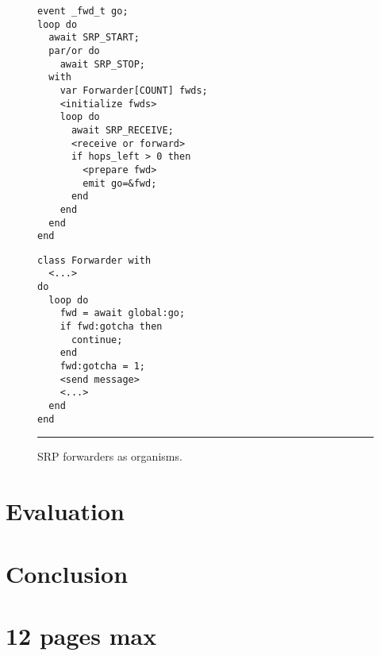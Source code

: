 \documentclass{sig-alternate-ipsn13}
\begin{document}
\begin{figure}[t]
\begin{minipage}[t]{0.45\linewidth}
{\small
\begin{verbatim}
event _fwd_t go;
loop do
  await SRP_START;
  par/or do
    await SRP_STOP;
  with
    var Forwarder[COUNT] fwds;
    <initialize fwds>
    loop do
      await SRP_RECEIVE;
      <receive or forward>
      if hops_left > 0 then
        <prepare fwd>
        emit go=&fwd;
      end
    end
  end
end
\end{verbatim}
}
\end{minipage}
%
\hspace{0.0cm}
%
\begin{minipage}[t]{0.45\linewidth}
{\small
\begin{verbatim}
class Forwarder with
  <...>
do
  loop do
    fwd = await global:go;
    if fwd:gotcha then
      continue;
    end
    fwd:gotcha = 1;
    <send message>
    <...>
  end
end
\end{verbatim}
}
\end{minipage}
\rule{8.5cm}{0.37pt}
\caption{ SRP forwarders as organisms.
\label{lst.srp.xxx}
}
\end{figure}

\section{Evaluation}

\section{Conclusion}

\section{12 pages max}



\end{document}
